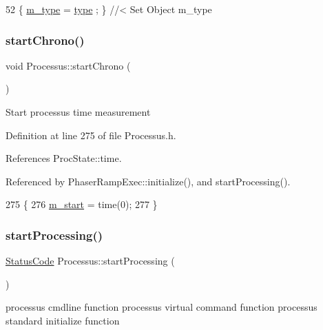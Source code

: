 \begin{DoxyCode}
52 \{ \hyperlink{classObject_a457a600fe8c00eb1034374f75110a78c}{m\_type}  = \hyperlink{classObject_a84f99f70f144a83e1582d1d0f84e4e62}{type}  ; \} \textcolor{comment}{//< Set Object m\_type}
\end{DoxyCode}
\mbox{\label{classProcessus_a5e4d34b86241fa0756e07375a14ff4b2}} 
\subsubsection{\texorpdfstring{start\+Chrono()}{startChrono()}}
{\footnotesize\ttfamily void Processus\+::start\+Chrono (\begin{DoxyParamCaption}{ }\end{DoxyParamCaption})\hspace{0.3cm}{\ttfamily [inline]}}

Start processus time measurement 

Definition at line 275 of file Processus.\+h.



References Proc\+State\+::time.



Referenced by Phaser\+Ramp\+Exec\+::initialize(), and start\+Processing().


\begin{DoxyCode}
275                     \{
276     \hyperlink{classProcessus_a8ec00b2e12c5beada932610f30218e93}{m\_start} = time(0);
277   \}
\end{DoxyCode}
\mbox{\label{classProcessus_a09319bde9bed93e290f69b4e04585543}} 
\subsubsection{\texorpdfstring{start\+Processing()}{startProcessing()}}
{\footnotesize\ttfamily \hyperlink{classStatusCode}{Status\+Code} Processus\+::start\+Processing (\begin{DoxyParamCaption}{ }\end{DoxyParamCaption})}

processus cmdline function processus virtual command function processus standard initialize function 

